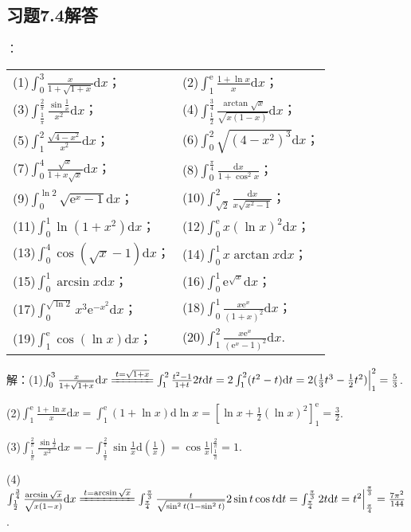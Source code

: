 \documentclass[12pt,UTF8]{ctexart}
\begin{document}
\subsection{习题7.4解答}
\begin{enumerate}
：
\newline
\begin{tabular}{ll}
(1)$\int_0^3\frac x{1+\sqrt{1+x}}\mathrm dx$；&(2)$\int_1^{\mathrm e}\frac{1+\ln x}x\mathrm dx$；\\
(3)$\int_{\frac1\pi}^{\frac2\pi}\frac{\sin\frac1x}{x^2}\mathrm dx$；&(4)$\int_{\frac12}^{\frac34}\frac{\arctan\sqrt x}{\sqrt{x(1-x)}}\mathrm dx$；\\
(5)$\int_1^2\frac{\sqrt{4-x^2}}{x^2}\mathrm dx$；&(6)$\int_0^2\sqrt{(4-x^2)^3}\mathrm dx$；\\
(7)$\int_0^4\frac{\sqrt x}{1+x\sqrt x}\mathrm dx$；&(8)$\int_0^{\frac\pi4}\frac{\mathrm dx}{1+\cos^2x}$；\\
(9)$\int_0^{\ln 2}\sqrt{\mathrm e^x-1}\mathrm dx$；&(10)$\int_{\sqrt2}^2\frac{\mathrm dx}{x\sqrt{x^2-1}}$；\\
(11)$\int_0^1\ln(1+x^2)\mathrm dx$；&(12)$\int_0^{\mathrm e}x(\ln x)^2\mathrm dx$；\\
(13)$\int_0^4\cos(\sqrt x-1)\mathrm dx$；&(14)$\int_0^1x\arctan x\mathrm dx$；\\
(15)$\int_0^1\arcsin x\mathrm dx$；&(16)$\int_0^1\mathrm e^{\sqrt x}\mathrm dx$；\\
(17)$\int_0^{\sqrt{\ln2}}x^3\mathrm e^{-x^2}\mathrm dx$；&(18)$\int_0^1\frac{x\mathrm e^x}{(1+x)^2}\mathrm dx$；\\
(19)$\int_1^{\mathrm e}\cos(\ln x)\mathrm dx$；&(20)$\int_1^2\frac{x\mathrm e^x}{(\mathrm e^x-1)^2}\mathrm dx$.
\end{tabular}

解：(1)$\int_0^3\frac x{1+\sqrt{1+x}}\mathrm dx\xlongequal{t=\sqrt{1+x}}\int_1^2\frac{t^2-1}{1+t}2t\mathrm dt=2\int_1^2(t^2-t)\mathrm dt=2(\frac13t^3-\frac12t^2)\Big|_1^2=\frac53$.

(2)$\int_1^{\mathrm e}\frac{1+\ln x}x\mathrm dx=\int_1^{\mathrm e}(1+\ln x)\mathrm d\ln x=[\ln x+\frac12(\ln x)^2]_1^{\mathrm e}=\frac32$.

(3)$\int_{\frac1\pi}^{\frac2\pi}\frac{\sin\frac1x}{x^2}\mathrm dx=-\int_{\frac1\pi}^{\frac2\pi}\sin\frac1x\mathrm d(\frac1x)=\cos\frac1x\Big|_{\frac1\pi}^{\frac2\pi}=1$.

(4)$\int_{\frac12}^{\frac34}\frac{\arcsin\sqrt x}{\sqrt{x(1-x)}}\mathrm dx\xlongequal{t=\arcsin\sqrt x}\int_{\frac\pi4}^{\frac\pi3}\frac t{\sqrt{\sin^2t(1-\sin^2t)}}2\sin t\cos t\mathrm dt=\int_{\frac\pi4}^{\frac\pi3}2t\mathrm dt=t^2\Big|_{\frac\pi4}^{\frac\pi3}=\frac{7\pi^2}{144}$.


\end{enumerate}
\end{document}
